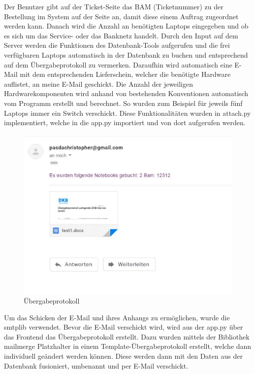 \noindent
Der Benutzer gibt auf der Ticket-Seite das BAM (Ticketnummer) zu der Bestellung im System auf der Seite an, damit diese einem Auftrag zugeordnet werden kann. Danach wird die Anzahl an benötigten Laptops eingegeben und ob es sich um das Service- oder das Banknetz handelt. Durch den Input auf dem Server werden die Funktionen des Datenbank-Tools aufgerufen und die frei verfügbaren Laptops automatisch in der Datenbank zu buchen und entsprechend auf dem Übergabeprotokoll zu vermerken. Daraufhin wird automatisch eine E-Mail mit dem entsprechenden Lieferschein, welcher die benötigte Hardware auflistet, an meine E-Mail geschickt. Die Anzahl der jeweiligen Hardwarekomponenten wird anhand von bestehenden Konventionen automatisch vom Programm erstellt und berechnet. So wurden zum Beispiel für jeweils fünf Laptops immer ein Switch verschickt. Diese Funktionalitäten wurden in attach.py implementiert, welche in die app.py importiert und von dort aufgerufen werden. 
\begin{figure}[H] 
  \centering
     \includegraphics[width=1\textwidth]{email.jpg}
  \caption{Übergabeprotokoll}
  \label{fig:Bild1}
\end{figure}

\noindent
Um das Schicken der E-Mail und ihres Anhangs zu ermöglichen, wurde die smtplib verwendet. Bevor die E-Mail verschickt wird, wird aus der app.py über das Frontend das Übergabeprotokoll erstellt. Dazu wurden mittels der Bibliothek mailmerge Platzhalter in einem Template-Übergabeprotokoll erstellt, welche dann individuell geändert werden können. Diese werden dann mit den Daten aus der Datenbank fusioniert, umbenannt und per E-Mail verschickt.
\\

